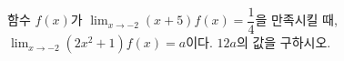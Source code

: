 함수 $f(x)$가 $\displaystyle\lim_{x\to -2}(x+5)f(x)=\dfrac{1}{4}$을 만족시킬 때, $\displaystyle\lim_{x\to -2}(2x^2+1)f(x)=a$이다. $12a$의 값을 구하시오.
